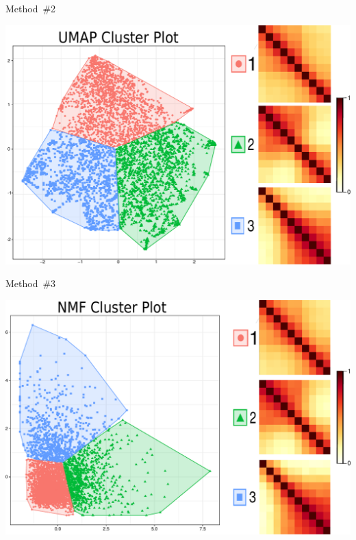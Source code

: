 \documentclass[landscape,a0paper,fontscale=0.285]{baposter} %
\begin{document}
\begin{poster}

\begin{posterbox}[name=section04, column=1, below=section03, height=0.333]{Method\ \#2}
\begin{center}
\includegraphics[width=0.9\linewidth, height=160\lineheight]{230902_Granta519cl27_24hdTAG_MYC5p_30mHyb_4phBl_30step_allfits_UMAP_clusPlot_matrices.pdf}
\end{center}
\end{posterbox}

\begin{posterbox}[name=section05, column=1, below=section04, height=0.333, above=bottom]{Method\ \#3}
\begin{center}
\includegraphics[width=0.9\linewidth, height=155\lineheight]{230902_Granta519cl27_24hdTAG_MYC5p_30mHyb_4phBl_30step_allfits_NMF_clusPlot_matrices.pdf}
\end{center}
\end{posterbox}


\end{poster}
\end{document}
